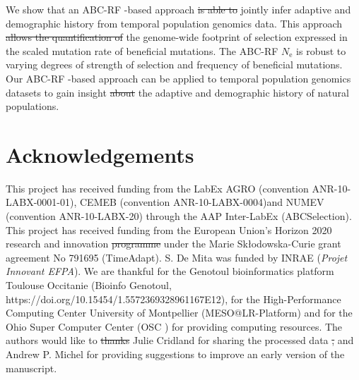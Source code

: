 \documentclass[a4paper, 12pt]{article}
\providecommand{\DIFaddtex}[1]{{\protect\color{blue}\uwave{#1}}} %
\providecommand{\DIFdeltex}[1]{{\protect\color{red}\sout{#1}}}                      %
\providecommand{\DIFaddbegin}{} %
\providecommand{\DIFaddend}{} %
\providecommand{\DIFdelbegin}{} %
\providecommand{\DIFdelend}{} %
\providecommand{\DIFadd}[1]{\texorpdfstring{\DIFaddtex{#1}}{#1}} %
\providecommand{\DIFdel}[1]{\texorpdfstring{\DIFdeltex{#1}}{}} %
\newcommand{\DIFscaledelfig}{0.5}
\newlength{\DIFdelgraphicswidth} %
\newlength{\DIFdelgraphicsheight} %
\newcommand{\DIFaddincludegraphics}[2][]{{\color{blue}\fbox{\DIFOincludegraphics[#1]{#2}}}} %
\newcommand{\DIFdelincludegraphics}[2][]{%
\sbox{\DIFdelgraphicsbox}{\DIFOincludegraphics[#1]{#2}}%
\settoboxwidth{\DIFdelgraphicswidth}{\DIFdelgraphicsbox} %
\settoboxtotalheight{\DIFdelgraphicsheight}{\DIFdelgraphicsbox} %
\scalebox{\DIFscaledelfig}{%
\parbox[b]{\DIFdelgraphicswidth}{\usebox{\DIFdelgraphicsbox}\\[-\baselineskip] \rule{\DIFdelgraphicswidth}{0em}}\llap{\resizebox{\DIFdelgraphicswidth}{\DIFdelgraphicsheight}{%
\setlength{\unitlength}{\DIFdelgraphicswidth}%
\begin{picture}(1,1)%
\thicklines\linethickness{2pt} %
{\color[rgb]{1,0,0}\put(0,0){\framebox(1,1){}}}%
{\color[rgb]{1,0,0}\put(0,0){\line( 1,1){1}}}%
{\color[rgb]{1,0,0}\put(0,1){\line(1,-1){1}}}%
\end{picture}%
}\hspace*{3pt}}} %
} %
\DeclareRobustCommand{\DIFaddbegin}{\DIFOaddbegin \let\includegraphics\DIFaddincludegraphics} %
\DeclareRobustCommand{\DIFaddend}{\DIFOaddend \let\includegraphics\DIFOincludegraphics} %
\DeclareRobustCommand{\DIFdelbegin}{\DIFOdelbegin \let\includegraphics\DIFdelincludegraphics} %
\DeclareRobustCommand{\DIFdelend}{\DIFOaddend \let\includegraphics\DIFOincludegraphics} %
\begin{document}
We show that an ABC-RF -based approach \DIFdelbegin \DIFdel{is able to }\DIFdelend \DIFaddbegin \DIFadd{can }\DIFaddend jointly infer adaptive and demographic history from temporal population genomics data. This approach \DIFdelbegin \DIFdel{allows the quantification of }\DIFdelend \DIFaddbegin \DIFadd{quantifies }\DIFaddend the genome-wide footprint of selection expressed in the scaled mutation rate of beneficial mutations. The ABC-RF $N_{\mathrm{e}}$ is robust to varying degrees of strength of selection and frequency of beneficial mutations. Our ABC-RF -based approach can be applied to temporal population genomics datasets to gain insight \DIFdelbegin \DIFdel{about }\DIFdelend \DIFaddbegin \DIFadd{into }\DIFaddend the adaptive and demographic history of natural populations.

\section*{Acknowledgements}

This project has received funding from the LabEx AGRO (convention ANR-10-LABX-0001-01), CEMEB (convention ANR-10-LABX-0004)\DIFaddbegin \DIFadd{, }\DIFaddend and NUMEV (convention ANR-10-LABX-20) through the AAP Inter-LabEx (ABCSelection). This project has received funding from the European Union's Horizon 2020 research and innovation \DIFdelbegin \DIFdel{programme }\DIFdelend \DIFaddbegin \DIFadd{program }\DIFaddend under the Marie Skłodowska-Curie grant agreement No 791695 (TimeAdapt). S. De Mita was funded by INRAE (\textit{Projet Innovant EFPA}). We are thankful for the Genotoul bioinformatics platform Toulouse Occitanie (Bioinfo Genotoul, https://doi.org/10.15454/1.5572369328961167E12), for the High-Performance Computing Center University of Montpellier (MESO@LR-Platform) and for the Ohio Super Computer Center (OSC \citet{OhioSupercomputerCenter1987}) for providing computing resources. The authors would like to \DIFdelbegin \DIFdel{thanks }\DIFdelend \DIFaddbegin \DIFadd{thank }\DIFaddend Julie Cridland for sharing the processed data \DIFdelbegin \DIFdel{, }\DIFdelend and Andrew P. Michel for providing suggestions to improve an early version of the manuscript. 



\end{document}
